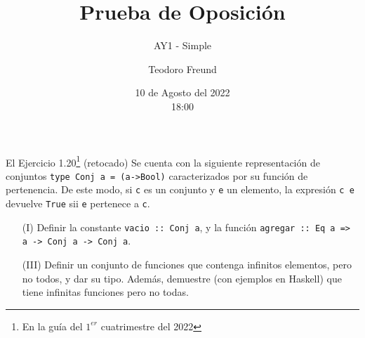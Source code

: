 \documentclass[pdf]{beamer}
\title{Prueba de Oposición}
\subtitle{AY1 - Simple}
\author{\large{Teodoro Freund}}
\date{10 de Agosto del 2022 \\ \footnotesize{18:00}} %
\begin{document}
\begin{frame}
\titlepage
\end{frame}

\begin{frame}{El Ejercicio 1.20\footnote{En la guía del $1^{er}$ cuatrimestre del 2022} (retocado)}
Se cuenta con la siguiente representación de conjuntos \texttt{type Conj a = (a->Bool)} caracterizados por su
función de pertenencia. De este modo, si \texttt{c} es un conjunto y \texttt{e} un elemento, la expresión \texttt{c e} devuelve \texttt{True} sii \texttt{e}
pertenece a \texttt{c}.

\pause

\begin{enumerate}[label=(\roman*)]

\item[(I)] Definir la constante \texttt{vacio :: Conj a}, y la función \texttt{agregar :: Eq a => a -> Conj a -> Conj a}.

\item[(III)] Definir un conjunto de funciones que contenga infinitos elementos, pero no todos, y dar su tipo. Además, demuestre (con ejemplos en Haskell) que tiene infinitas funciones pero no todas.

\end{enumerate}

\end{frame}


\end{document}
